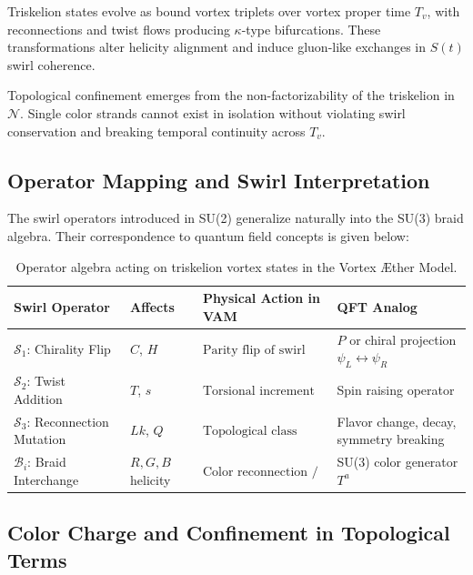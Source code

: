 \documentclass[12pt]{article}
\begin{document}
Triskelion states evolve as bound vortex triplets over vortex proper time \( T_v \), with reconnections and twist flows producing \(\kappa\)-type bifurcations. These transformations alter helicity alignment and induce gluon-like exchanges in $S(t)$ swirl coherence.

Topological confinement emerges from the non-factorizability of the triskelion in $\mathcal{N}$. Single color strands cannot exist in isolation without violating swirl conservation and breaking temporal continuity across \( T_v \).

\subsection*{Operator Mapping and Swirl Interpretation}

The swirl operators introduced in SU(2) generalize naturally into the SU(3) braid algebra. Their correspondence to quantum field concepts is given below:

\begin{table}[H]
    \centering
    \scriptsize
    \renewcommand{\arraystretch}{1.4}
    \begin{tabular}{|l|l|l|l|}
        \hline
        \textbf{Swirl Operator} & \textbf{Affects} & \textbf{Physical Action in VAM} & \textbf{QFT Analog} \\
        \hline
        $\mathcal{S}_1$: Chirality Flip & $C$, $H$ & $\text{Parity flip of swirl orientation}$ & $P$ or chiral projection $\psi_L \leftrightarrow \psi_R$ \\
        \hline
        $\mathcal{S}_2$: Twist Addition & $T$, $s$ & $\text{Torsional increment of knot frame}$ & Spin raising operator \\
        \hline
        $\mathcal{S}_3$: Reconnection Mutation & $Lk$, $Q$ & $\text{Topological class bifurcation}$ & Flavor change, decay, symmetry breaking \\
        \hline
        $\mathcal{B}_i$: Braid Interchange & $R,G,B$ helicity & $\text{Color reconnection / gluon-like twist}$ & SU(3) color generator $T^a$ \\
        \hline
    \end{tabular}
    \caption{Operator algebra acting on triskelion vortex states in the Vortex \AE{}ther Model.}
\end{table}

\subsection*{Color Charge and Confinement in Topological Terms}
\end{document}
